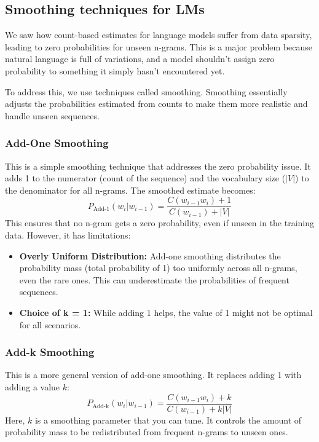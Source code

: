\documentclass[12pt]{article}
\begin{document}
    \subsection{Smoothing techniques for LMs}
        We saw how count-based estimates for language models suffer from data sparsity, leading to zero probabilities for unseen n-grams. This is a major problem because natural language is full of variations, and a model shouldn't assign zero probability to something it simply hasn't encountered yet.

        To address this, we use techniques called smoothing. Smoothing essentially adjusts the probabilities estimated from counts to make them more realistic and handle unseen sequences.

        \subsubsection{Add-One Smoothing}
            This is a simple smoothing technique that addresses the zero probability issue. It adds 1 to the numerator (count of the sequence) and the vocabulary size ($|V|$) to the denominator for all n-grams. The smoothed estimate becomes:
            \begin{equation}
                P_{\text{Add-1}}(w_i | w_{i-1}) = \frac{C(w_{i-1} w_i) + 1}{C(w_{i-1}) + |V|}
            \end{equation}
            This ensures that no n-gram gets a zero probability, even if unseen in the training data. However, it has limitations:
            \begin{itemize}
                \item \textbf{Overly Uniform Distribution:} Add-one smoothing distributes the probability mass (total probability of 1) too uniformly across all n-grams, even the rare ones. This can underestimate the probabilities of frequent sequences.
                \item \textbf{Choice of k = 1:} While adding 1 helps, the value of 1 might not be optimal for all scenarios.
            \end{itemize}

        \subsubsection{Add-k Smoothing}
            This is a more general version of add-one smoothing. It replaces adding 1 with adding a value $k$:
            \begin{equation}
            P_{\text{Add-k}}(w_i | w_{i-1}) = \frac{C(w_{i-1} w_i) + k}{C(w_{i-1}) + k |V|}
            \end{equation}
            Here, $k$ is a smoothing parameter that you can tune. It controls the amount of probability mass to be redistributed from frequent n-grams to unseen ones.
            
\end{document}
